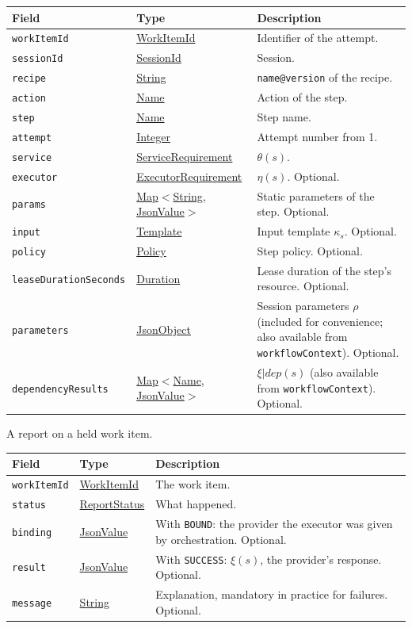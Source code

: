 \documentclass[a4paper]{arrowhead}
\newcommand{\mref}[1]{{\textcolor{ArrowheadPurple}{\hyperref[sec:model:#1]{#1}}}}
\newcommand{\pref}[1]{{\textcolor{ArrowheadGrey}{\hyperref[sec:model:primitives:#1]{#1}}}}
\begin{document}
{\small
\begin{longtable}{|p{3.9cm}|p{4.4cm}|p{7.5cm}|}

\hline
\rowcolor{gray!33} Field & Type & Description \\ \hline
\endhead
\texttt{workItemId} & \pref{WorkItemId} & Identifier of the attempt. \\ \hline
\texttt{sessionId} & \pref{SessionId} & Session. \\ \hline
\texttt{recipe} & \pref{String} & \texttt{name@version} of the recipe. \\ \hline
\texttt{action} & \pref{Name} & Action of the step. \\ \hline
\texttt{step} & \pref{Name} & Step name. \\ \hline
\texttt{attempt} & \pref{Integer} & Attempt number from 1. \\ \hline
\texttt{service} & \mref{ServiceRequirement} & $\theta(s)$. \\ \hline
\texttt{executor} & \mref{ExecutorRequirement} & $\eta(s)$. Optional. \\ \hline
\texttt{params} & \pref{Map}$<$\pref{String}, \pref{JsonValue}$>$ & Static parameters of the step. Optional. \\ \hline
\texttt{input} & \pref{Template} & Input template $\kappa_s$. Optional. \\ \hline
\texttt{policy} & \mref{Policy} & Step policy. Optional. \\ \hline
\texttt{leaseDurationSeconds} & \pref{Duration} & Lease duration of the step's resource. Optional. \\ \hline
\texttt{parameters} & \pref{JsonObject} & Session parameters $\rho$ (included for convenience; also available from \texttt{workflowContext}). Optional. \\ \hline
\texttt{dependencyResults} & \pref{Map}$<$\pref{Name}, \pref{JsonValue}$>$ & $\xi|dep(s)$ (also available from \texttt{workflowContext}). Optional. \\ \hline
\end{longtable}
}

A report on a held work item.

{\small
\begin{longtable}{|p{3.9cm}|p{4.4cm}|p{7.5cm}|}

\hline
\rowcolor{gray!33} Field & Type & Description \\ \hline
\endhead
\texttt{workItemId} & \pref{WorkItemId} & The work item. \\ \hline
\texttt{status} & \mref{ReportStatus} & What happened. \\ \hline
\texttt{binding} & \pref{JsonValue} & With \texttt{BOUND}: the provider the executor was given by orchestration. Optional. \\ \hline
\texttt{result} & \pref{JsonValue} & With \texttt{SUCCESS}: $\xi(s)$, the provider's response. Optional. \\ \hline
\texttt{message} & \pref{String} & Explanation, mandatory in practice for failures. Optional. \\ \hline
\end{longtable}
}
\end{document}
